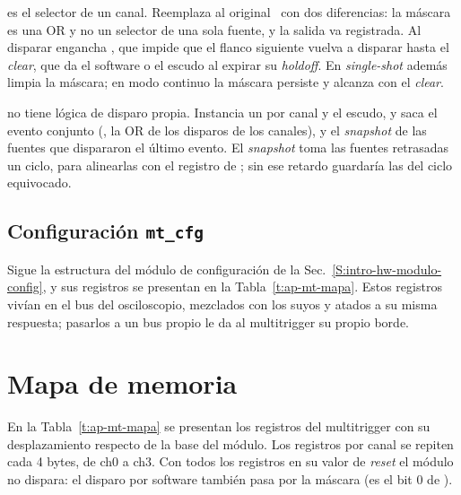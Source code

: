  es el selector de un canal. Reemplaza al
 original~\cite{RedPitayaFPGA} con dos diferencias: la
máscara es una OR y no un selector de una sola fuente, y la salida va
registrada. Al disparar engancha , que impide que el
flanco siguiente vuelva a disparar hasta el \emph{clear}, que da el software o el
escudo al expirar su \emph{holdoff}. En \emph{single-shot} además limpia la máscara; en modo
continuo la máscara persiste y alcanza con el \emph{clear}.

 no tiene lógica de disparo propia. Instancia un
 por canal y el escudo, y saca el evento conjunto
(, la OR de los disparos de los canales),
 y el \emph{snapshot} de las fuentes que dispararon el último evento.
El \emph{snapshot} toma las fuentes retrasadas un ciclo, para alinearlas con el
registro de ; sin ese retardo guardaría las del ciclo
equivocado.

\subsection{Configuración \texorpdfstring{\texttt{mt\_cfg}}{mt\_cfg}}
\label{S:ap-mt-cfg}

Sigue la estructura del módulo de configuración de la
Sec.~\ref{S:intro-hw-modulo-config}, y sus registros se presentan en la Tabla~\ref{t:ap-mt-mapa}.
Estos registros vivían en el bus del osciloscopio, mezclados con los suyos y
atados a su misma respuesta; pasarlos a un bus propio le da al multitrigger su
propio borde.

\section{Mapa de memoria}
\label{S:ap-mt-mapa}

En la Tabla~\ref{t:ap-mt-mapa} se presentan los registros del multitrigger con
su desplazamiento respecto de la base del módulo. Los registros por canal se repiten cada 4
bytes, de ch0 a ch3. Con todos los registros en su valor de \emph{reset} el módulo no
dispara: el disparo por software también pasa por la máscara (es el bit 0 de
).

